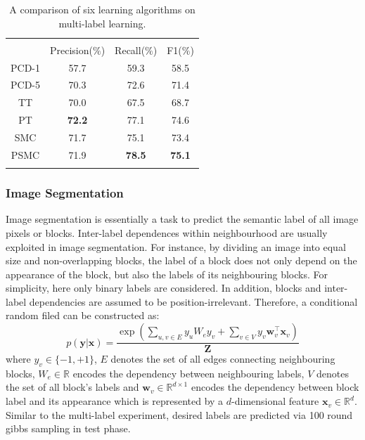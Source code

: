 \begin{table}
	\center
\begin{tabular}{cccc} 
\Xhline{2\arrayrulewidth} \\ 
       & Precision($\%$) & Recall($\%$) & F1($\%$) \\ \hline 
 PCD-1 & 57.7            & 59.3         & 58.5 \\
 PCD-5 & 70.3            & 72.6         & 71.4 \\
 TT    & 70.0            & 67.5         & 68.7 \\
 PT    & {\bf 72.2}      & 77.1         & 74.6 \\
SMC    & 71.7            & 75.1         & 73.4 \\
PSMC   & 71.9            & {\bf 78.5}   & {\bf 75.1} \\ 
\Xhline{2\arrayrulewidth}
 \end{tabular}
 \caption{A comparison of six learning algorithms on multi-label learning. }
	\label{tab:scene_results}
\end{table}

\subsubsection{Image Segmentation} 
Image segmentation is  essentially a task to predict the semantic label of all image pixels or blocks.    
Inter-label dependences within neighbourhood are usually exploited in image segmentation. For instance, by dividing an image into equal size and non-overlapping 
blocks, the label of a block does not only depend on the appearance of the block, but also the labels of its neighbouring blocks. For simplicity, here 
only binary labels are considered. In addition, blocks and inter-label dependencies are assumed to be position-irrelevant. Therefore, a conditional random filed can 
be constructed as:               
\begin{equation}
	p(\mathbf{y}|\mathbf{x})=\frac{\exp(\sum_{u,v\in E}y_u W_e y_v+\sum_{v\in V} y_v \mathbf{w}_v^\top \mathbf{x}_v) }{\mathbf{Z}}
\end{equation}
where $y_v\in\{-1,+1\}$, $E$ denotes the set of all edges connecting neighbouring blocks, $W_e\in\mathbb{R}$ encodes the dependency between neighbouring labels, $V$ denotes the set of all 
block's labels and $\mathbf{w}_v\in \mathbb{R}^{d\times 1}$ encodes the dependency between block label and its appearance which is represented by a $d$-dimensional feature $\mathbf{x}_v\in\mathbb{R}^d$.    
Similar to the multi-label experiment, desired labels are predicted via 100 round gibbs sampling in test phase.      


